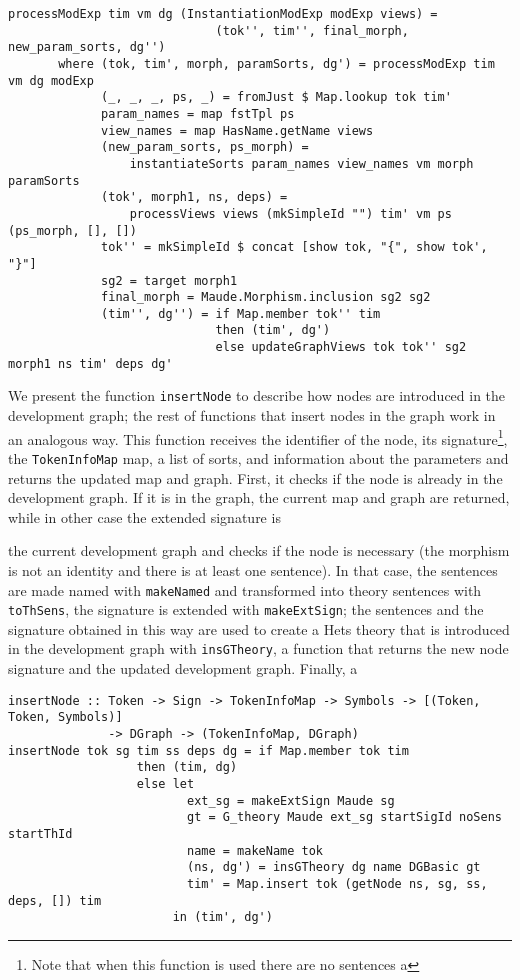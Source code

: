\begin{itemize}
{\codesize
\begin{verbatim}
processModExp tim vm dg (InstantiationModExp modExp views) =
                             (tok'', tim'', final_morph, new_param_sorts, dg'')
       where (tok, tim', morph, paramSorts, dg') = processModExp tim vm dg modExp
             (_, _, _, ps, _) = fromJust $ Map.lookup tok tim'
             param_names = map fstTpl ps
             view_names = map HasName.getName views
             (new_param_sorts, ps_morph) = 
                 instantiateSorts param_names view_names vm morph paramSorts
             (tok', morph1, ns, deps) = 
                 processViews views (mkSimpleId "") tim' vm ps (ps_morph, [], [])
             tok'' = mkSimpleId $ concat [show tok, "{", show tok', "}"]
             sg2 = target morph1
             final_morph = Maude.Morphism.inclusion sg2 sg2
             (tim'', dg'') = if Map.member tok'' tim
                             then (tim', dg')
                             else updateGraphViews tok tok'' sg2 morph1 ns tim' deps dg'
\end{verbatim}
}

\end{itemize}

We present the function \verb"insertNode" to describe how nodes are
introduced in the development graph; the rest of functions that insert
nodes in the graph work in an analogous way. This function receives the
identifier of the node, its signature\footnote{Note that when this
function is used there are no sentences a }, the \verb"TokenInfoMap" map,
a list of sorts, and information about the parameters and
returns the updated map and graph. First, it checks if
the node is already in the development graph. If it is in the graph,
the current map and graph are returned, while in other case the extended
signature is


the current development graph and checks if the node is necessary (the
morphism is not an identity and there is at least one sentence). In that
case, the sentences are made named with \verb"makeNamed" and transformed
into theory sentences with \verb"toThSens", the signature is extended with
\verb"makeExtSign"; the sentences and the signature obtained in this way
are used to create a Hets theory that is introduced in the development
graph with \verb"insGTheory", a function that returns the new node signature
and the updated development graph. Finally, a 

{\codesize
\begin{verbatim}
insertNode :: Token -> Sign -> TokenInfoMap -> Symbols -> [(Token, Token, Symbols)]
              -> DGraph -> (TokenInfoMap, DGraph)
insertNode tok sg tim ss deps dg = if Map.member tok tim
                  then (tim, dg)
                  else let
                         ext_sg = makeExtSign Maude sg
                         gt = G_theory Maude ext_sg startSigId noSens startThId
                         name = makeName tok
                         (ns, dg') = insGTheory dg name DGBasic gt
                         tim' = Map.insert tok (getNode ns, sg, ss, deps, []) tim
                       in (tim', dg')
\end{verbatim}
}

